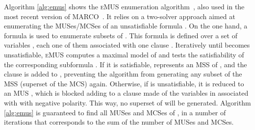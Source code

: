 \documentclass{llncs}
\newcommand{\emus}{\textsc{eMUS}\xspace}
\begin{document}
\begin{algorithm}[t]
{\small 
\DontPrintSemicolon
\SetAlgoNoLine
\LinesNumbered
\SetFillComment
\SetKw{KwNot}{not\xspace}
\SetKw{KwAnd}{and\xspace}
\SetKw{KwOr}{or\xspace}
\smallskip
\SetAlgoVlined
     

    \;
    \While{\true} {

       \;


  	
       

  	\;
  }
}
\caption{\emus~\cite{pms-aaai13}~/~MARCO~\cite{lpmms-cj15} \label{alg:emus}}
\end{algorithm}

Algorithm \ref{alg:emus} shows the \emus enumeration
algorithm~\cite{pms-aaai13}, also used in the most recent version of
MARCO~\cite{lpmms-cj15}.
It relies on a two-solver approach
aimed at enumerating the MUSes/MCSes of an unsatisfiable formula .
On the one hand, a formula  is used to enumerate subsets of . This formula 
is defined over a set of variables , each one of them associated with one clause
. Iteratively until  becomes unsatisfiable, \textsc{eMUS} computes a maximal model  of  and 
tests the satisfiability of the corresponding subformula . If it is
satisfiable,  represents an MSS of , and the clause  is added to , preventing the algorithm from generating any subset of the MSS (superset of the MCS) again. Otherwise, if  is unsatisfiable, it is reduced to an MUS , which is blocked adding to  a clause made of the variables in  associated with  with negative polarity. This way, no superset of  will be generated. Algorithm \ref{alg:emus} is guaranteed to find all MUSes and MCSes of , in a number of iterations that corresponds to the sum of the number of MUSes and MCSes.
\end{document}
